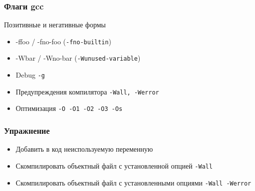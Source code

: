 \begin{frame}
\frametitle{Флаги gcc}

	\begin{block}{Позитивные и негативные формы}
		\begin{itemize}
			\item -ffoo / -fno-foo ({\tt -fno-builtin})
			\item -Wbar / -Wno-bar ({\tt -Wunused-variable})
		\end{itemize}
	\end{block}


	\begin{itemize}
	  \item Debug {\tt -g}
	  \item Предупреждения компилятора {\tt -Wall, -Werror}
	  \item Оптимизация {\tt -O -O1 -O2 -O3 -Os}
	\end{itemize}
\end{frame}

\begin{frame}
	\frametitle{Упражнение}
	\begin{itemize}
		\item Добавить в код неиспользуемую переменную
		\item Скомпилировать объектный файл с установленной опцией {\tt -Wall}
		\item Скомпилировать объектный файл с установленными опциями {\tt -Wall -Werror}
	\end{itemize}
\end{frame}


